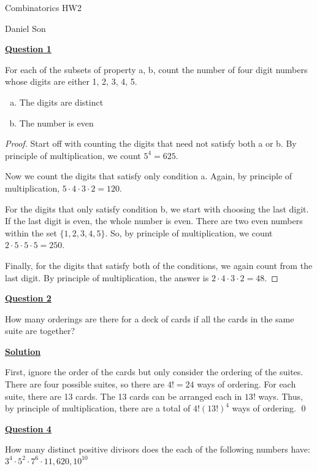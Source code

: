 \documentclass{article}
\newcommand{\new}[1]{
    \vspace{2mm}
    \noindent
    \textbf{
    \underline{#1}}
}
\begin{document}
\begin{center}
\LARGE
Combinatorics HW2

\Large
Daniel Son
\end{center}



\new{Question 1}
For each of the subsets of property a, b, count the number of four
 digit numbers whose digits are either 1, 2, 3, 4, 5. 

 \begin{enumerate}[a)]
    \item The digits are distinct 
    \item The number is even
\end {enumerate}

\begin{proof}
    Start off with counting the digits that need not satisfy both 
    a or b. By principle of multiplication, we count $5^4 = 625$. 
    
    Now we count the digits that satisfy only condition a. Again, 
    by principle of multiplication, $5\cdot4\cdot3\cdot2 = 120$. 

    For the digits that only satisfy condition b, we start with choosing 
    the last digit. If the last digit is even, the whole number is even. 
    There are two even numbers within the set $\{1, 2, 3, 4, 5\}$. So, 
    by principle of multiplication, we count $2\cdot5\cdot5\cdot5 = 250$.
    
    Finally, for the digits that satisfy both of the conditions, 
    we again count from the last digit. By principle of multiplication, 
    the answer is $2\cdot4\cdot3\cdot2 = 48$. 
    
\end{proof}

\new{Question 2} 
How many orderings are there for a deck of cards if all the cards 
in the same suite are together?

\new{Solution}
 First, ignore the order of the cards 
but only consider the ordering of the suites. There are four possible suites, 
so there are $4! = 24$ ways of ordering. For each suite, there are 
13 cards. The 13 cards can be arranged each in $13!$ ways. Thus, by 
principle of multiplication, there are a total of $\boxed{4!(13!)^4}$ ways of 
ordering. \hfill \qed


\new{Question 4} 
How many distinct positive divisors does the each of the following numbers have:
$3^4\cdot5^2\cdot7^6\cdot11, 620, 10^{10}$
\end{document}
